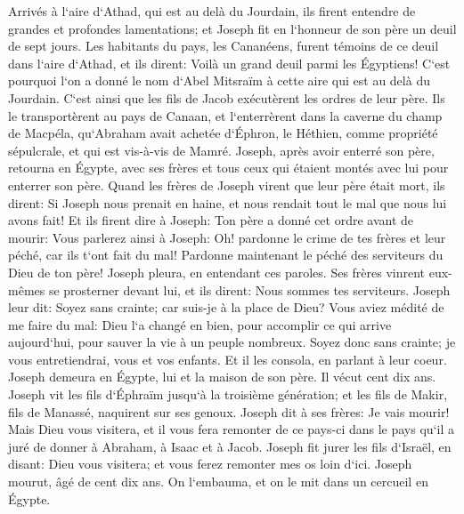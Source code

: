 \verse Arrivés à l`aire d`Athad, qui est au delà du Jourdain, ils firent entendre de grandes et profondes lamentations; et Joseph fit en l`honneur de son père un deuil de sept jours. 
\verse Les habitants du pays, les Cananéens, furent témoins de ce deuil dans l`aire d`Athad, et ils dirent: Voilà un grand deuil parmi les Égyptiens! C`est pourquoi l`on a donné le nom d`Abel Mitsraïm à cette aire qui est au delà du Jourdain. 
\verse C`est ainsi que les fils de Jacob exécutèrent les ordres de leur père. 
\verse Ils le transportèrent au pays de Canaan, et l`enterrèrent dans la caverne du champ de Macpéla, qu`Abraham avait achetée d`Éphron, le Héthien, comme propriété sépulcrale, et qui est vis-à-vis de Mamré. 
\verse Joseph, après avoir enterré son père, retourna en Égypte, avec ses frères et tous ceux qui étaient montés avec lui pour enterrer son père. 
\verse Quand les frères de Joseph virent que leur père était mort, ils dirent: Si Joseph nous prenait en haine, et nous rendait tout le mal que nous lui avons fait! 
\verse Et ils firent dire à Joseph: Ton père a donné cet ordre avant de mourir: 
\verse Vous parlerez ainsi à Joseph: Oh! pardonne le crime de tes frères et leur péché, car ils t`ont fait du mal! Pardonne maintenant le péché des serviteurs du Dieu de ton père! Joseph pleura, en entendant ces paroles. 
\verse Ses frères vinrent eux-mêmes se prosterner devant lui, et ils dirent: Nous sommes tes serviteurs. 
\verse Joseph leur dit: Soyez sans crainte; car suis-je à la place de Dieu? 
\verse Vous aviez médité de me faire du mal: Dieu l`a changé en bien, pour accomplir ce qui arrive aujourd`hui, pour sauver la vie à un peuple nombreux. 
\verse Soyez donc sans crainte; je vous entretiendrai, vous et vos enfants. Et il les consola, en parlant à leur coeur. 
\verse Joseph demeura en Égypte, lui et la maison de son père. Il vécut cent dix ans. 
\verse Joseph vit les fils d`Éphraïm jusqu`à la troisième génération; et les fils de Makir, fils de Manassé, naquirent sur ses genoux. 
\verse Joseph dit à ses frères: Je vais mourir! Mais Dieu vous visitera, et il vous fera remonter de ce pays-ci dans le pays qu`il a juré de donner à Abraham, à Isaac et à Jacob. 
\verse Joseph fit jurer les fils d`Israël, en disant: Dieu vous visitera; et vous ferez remonter mes os loin d`ici. 
\verse Joseph mourut, âgé de cent dix ans. On l`embauma, et on le mit dans un cercueil en Égypte. 
